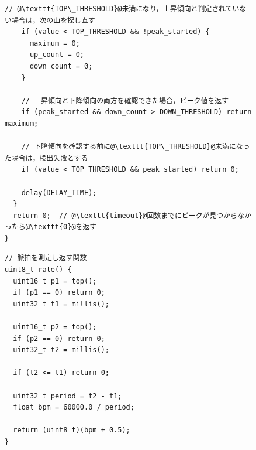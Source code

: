 \begin{figure}[H]
\begin{lstlisting}[caption=myPulse.cpp（前半：top関数によるピーク検出処理）, label=b3_myPulse.cpp_top, escapechar=\@]
    // @\texttt{TOP\_THRESHOLD}@未満になり，上昇傾向と判定されていない場合は，次の山を探し直す
    if (value < TOP_THRESHOLD && !peak_started) {
      maximum = 0;
      up_count = 0;
      down_count = 0;
    }

    // 上昇傾向と下降傾向の両方を確認できた場合，ピーク値を返す
    if (peak_started && down_count > DOWN_THRESHOLD) return maximum;

    // 下降傾向を確認する前に@\texttt{TOP\_THRESHOLD}@未満になった場合は，検出失敗とする
    if (value < TOP_THRESHOLD && peak_started) return 0;

    delay(DELAY_TIME);
  }
  return 0;  // @\texttt{timeout}@回数までにピークが見つからなかったら@\texttt{0}@を返す
}
    \end{lstlisting}
\end{figure}

\begin{figure}[H]
  \begin{lstlisting}[caption=myPulse.cpp（後半：rate関数による脈拍算出処理）, label=b3_myPulse.cpp_rate, firstnumber=55, escapechar=\@]
// 脈拍を測定し返す関数
uint8_t rate() {
  uint16_t p1 = top();
  if (p1 == 0) return 0;
  uint32_t t1 = millis();

  uint16_t p2 = top();
  if (p2 == 0) return 0;
  uint32_t t2 = millis();

  if (t2 <= t1) return 0;

  uint32_t period = t2 - t1;
  float bpm = 60000.0 / period;

  return (uint8_t)(bpm + 0.5);
}
    \end{lstlisting}
\end{figure}
